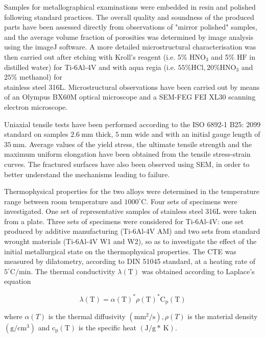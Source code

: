 \documentclass[10pt]{article}
\begin{document}
Samples for metallographical examinations were embedded in resin and polished following standard practices. The overall quality and soundness of the produced parts have been assessed directly from observations of "mirror polished" samples, and the average volume fraction of porosities was determined by image analysis using the imageJ software. A more detailed microstructural characterisation was then carried out after etching with Kroll's reagent (i.e. 5\% $\mathrm{HNO}_{3}$ and 5\% $\mathrm{HF}$ in distilled water) for Ti-6Al-4V and with aqua regia (i.e. $55 \% \mathrm{HCl}, 20 \% \mathrm{HNO}_{3}$ and $25 \%$ methanol) for\\
stainless steel 316L. Microstructural observations have been carried out by means of an Olympus BX60M optical microscope and a SEM-FEG FEI XL30 scanning electron microscope.

Uniaxial tensile tests have been performed according to the ISO 6892-1 B25: 2099 standard on samples $2.6 \mathrm{~mm}$ thick, $5 \mathrm{~mm}$ wide and with an initial gauge length of $35 \mathrm{~mm}$. Average values of the yield stress, the ultimate tensile strength and the maximum uniform elongation have been obtained from the tensile stress-strain curves. The fractured surfaces have also been observed using SEM, in order to better understand the mechanisms leading to failure.

Thermophysical properties for the two alloys were determined in the temperature range between room temperature and $1000^{\circ} \mathrm{C}$. Four sets of specimens were investigated. One set of representative samples of stainless steel 316L were taken from a plate. Three sets of specimens were considered for Ti-6Al-4V: one set produced by additive manufacturing (Ti-6Al-4V AM) and two sets from standard wrought materials (Ti-6Al-4V W1 and W2), so as to investigate the effect of the initial metallurgical state on the thermophysical properties. The CTE was measured by dilatometry, according to DIN 51045 standard, at a heating rate of $5^{\circ} \mathrm{C} / \mathrm{min}$. The thermal conductivity $\lambda(\mathrm{T})$ was obtained according to Laplace's equation

$$
\lambda(\mathrm{T})=\alpha(\mathrm{T})^{*} \rho(\mathrm{T})^{*} \mathrm{C}_{\mathrm{p}}(\mathrm{T})
$$

where $\alpha(T)$ is the thermal diffusivity $\left(\mathrm{mm}^{2} / \mathrm{s}\right), \rho(T)$ is the material density $\left(\mathrm{g} / \mathrm{cm}^{3}\right)$ and $\mathrm{c}_{\mathrm{p}}(\mathrm{T})$ is the specific heat $(\mathrm{J} / \mathrm{g} * \mathrm{~K})$.
\end{document}
